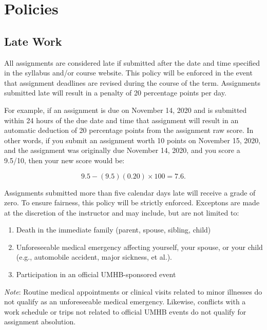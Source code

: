 \documentclass[
]{article}
\providecommand{\tightlist}{%
  \setlength{\itemsep}{0pt}\setlength{\parskip}{0pt}}
\begin{document}
\section{Policies}

\subsection{Late Work}

All assignments are considered late if submitted after the date and time
specified in the syllabus and/or course website. This policy will be
enforced in the event that assignment deadlines are revised during the
course of the term. Assignments submitted late will result in a penalty
of 20 percentage points per day.

For example, if an assignment is due on November 14, 2020 and is
submitted within 24 hours of the due date and time that assignment will
result in an automatic deduction of 20 percentage points from the
assignment raw score. In other words, if you submit an assignment worth
10 points on November 15, 2020, and the assignment was originally due
November 14, 2020, and you score a 9.5/10, then your new score would be:

\begin{equation}
9.5 - (9.5)(0.20) \times 100 = 7.6.
\end{equation}

Assignments submitted more than five calendar days late will receive a
grade of zero. To ensure fairness, this policy will be strictly
enforced. Exceptons are made at the discretion of the instructor and may
include, but are not limited to:

\begin{enumerate}
\def\labelenumi{\arabic{enumi}.}
\tightlist
\item
  Death in the immediate family (parent, spouse, sibling, child)
\item
  Unforeseeable medical emergency affecting yourself, your spouse, or
  your child (e.g., automobile accident, major sickness, et al.).
\item
  Participation in an official UMHB-sponsored event
\end{enumerate}

\emph{Note}: Routine medical appointments or clinical visits related to
minor illnesses do not qualify as an unforeseeable medical emergency.
Likewise, conflicts with a work schedule or trips not related to
official UMHB events do not qualify for assignment absolution.
\end{document}
